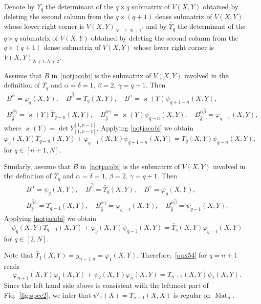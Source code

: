 \documentclass{amsart}
\theoremstyle{definition}
\theoremstyle{remark}
\numberwithin{equation}{section}
\numberwithin{theorem}{section}
\begin{document}
Denote by $\Upsilon_q$ the determinant of the $q\times q$ submatrix of $V(X,Y)$ obtained by deleting the 
second column from the $q\times (q+1)$ dense submatrix of $V(X,Y)$ whose lower right corner is $V(X,Y)_{N+1,N+1}$,
and by $\bar\Upsilon_q$ the determinant of  the $q\times q$ submatrix of $V(X,Y)$ obtained by deleting the second 
column from the $q\times (q+1)$ dense submatrix of $V(X,Y)$ whose lower right corner is $V(X,Y)_{N+1,N+2}$. 

Assume that $B$ in~\eqref{notjacobi} is the submatrix of $V(X,Y)$ involved in the definition of $\Upsilon_q$
and $\alpha=\delta=1$, $\beta=2$, $\gamma=q+1$.
Then
\begin{gather*}
B^{\hat\alpha}={{\varphi}}_q(X,Y), \quad B^{\hat\beta}=\Upsilon_q(X,Y), \quad B^{\hat\gamma}=\varkappa(Y){{\psi}}_{q+1-n}(X,Y),\\
B^{\hat\beta\hat\gamma}_{\hat\delta}=\varkappa(Y)\bar\Upsilon_{q-n}(X,Y),\quad 
B^{\hat\alpha\hat\gamma}_{\hat\delta}=\varkappa(Y){{\psi}}_{q-n}(X,Y),\quad
B^{\hat\alpha\hat\beta}_{\hat\delta}={{\varphi}}_{q-1}(X,Y),
\end{gather*}
where $\varkappa(Y) = \det Y_{[1,n-1]}^{[1,n-1]}$. 
Applying \eqref{notjacobi}  we obtain
\begin{equation}
\label{aux54}
{{\varphi}}_{q}(X,Y) \bar\Upsilon_{q-n}(X,Y)+ {{\varphi}}_{q-1}(X,Y){{\psi}}_{q+1-n}(X,Y)  
 = \Upsilon_{q}(X,Y) {{\psi}}_{q-n}(X,Y),
\end{equation}
for $q\in [n+1,N]$.

Similarly, assume that $B$ in~\eqref{notjacobi} is the submatrix of $V(X,Y)$ involved in the definition 
of $\bar\Upsilon_q$
and $\alpha=\delta=1$, $\beta=2$, $\gamma=q+1$.
Then
\begin{gather*}
B^{\hat\alpha}={{\psi}}_q(X,Y), \quad B^{\hat\beta}=\bar\Upsilon_q(X,Y), \quad B^{\hat\gamma}={{\varphi}}_{q}(X,Y),\\
B^{\hat\beta\hat\gamma}_{\hat\delta}=\Upsilon_{q-1}(X,Y),\quad 
B^{\hat\alpha\hat\gamma}_{\hat\delta}={{\varphi}}_{q-1}(X,Y),\quad
B^{\hat\alpha\hat\beta}_{\hat\delta}={{\psi}}_{q-1}(X,Y).
\end{gather*}
Applying \eqref{notjacobi}  we obtain
\begin{equation}
\label{aux55}
{{\psi}}_{q}(X,Y) \Upsilon_{q-1}(X,Y) + {{\varphi}}_{q}(X,Y) {{\psi}}_{q-1}(X,Y) = \bar\Upsilon_q(X,Y) {{\varphi}}_{q-1}(X,Y)
\end{equation}
for $q\in [2,N]$.

Note that $\bar\Upsilon_1(X,Y)=y_{n-1,n}={{\varphi}}_1(X,Y)$. Therefore,~\eqref{aux54} for $q=n+1$ reads
\begin{equation*}
{{\varphi}}_{n+1}(X,Y) {{\varphi}}_{1}(X,Y) + {{\psi}}_{2}(X,Y) {{\varphi}}_{n}(X,Y)
= \Upsilon_{n+1}(X,Y) {{\psi}}_{1}(X,Y). 
\end{equation*}
Since the left hand side above is consistent with the leftmost part of Fiq.~\ref{fig:spec2}, we infer
that ${{\psi}}'_{1}(X)=\Upsilon_{n+1}(X,X)$ is regular on ${\operatorname{Mat}}_n$.
\end{document}
